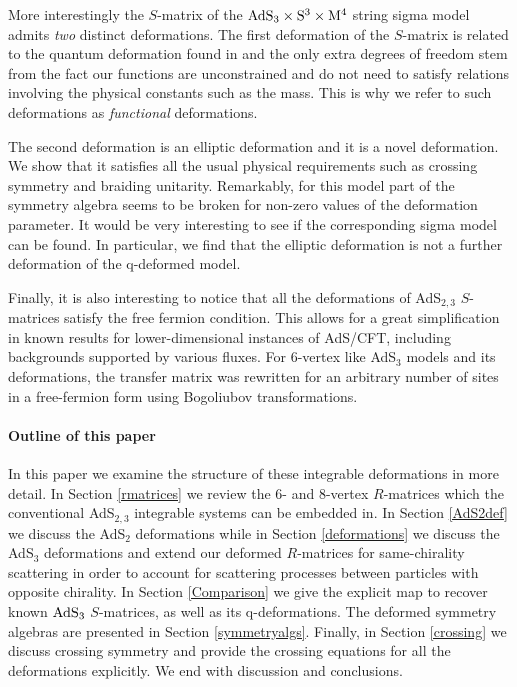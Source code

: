 \documentclass[12pt,a4paper]{article}
\numberwithin{equation}{section}
\begin{document}
More interestingly the $S$-matrix of the $ {{\rm AdS}}_3\times \mathrm{S}^3\times \mathrm{M}^4$ string sigma model admits \textit{two} distinct deformations. The first deformation of the $S$-matrix is related to the quantum deformation found in \cite{Hoare:2014oua,Seibold:2021lju} and the only extra degrees of freedom stem from the fact our functions are unconstrained and do not need to satisfy relations involving the physical constants such as the mass. This is why we refer to such deformations as \textit{functional} deformations.

The second deformation is an elliptic deformation and it is a novel deformation. We show that it satisfies all the usual physical requirements such as crossing symmetry and braiding unitarity. Remarkably, for this model part of the symmetry algebra seems to be broken for non-zero values of the deformation parameter. It would be very interesting to see if the corresponding sigma model can be found. In particular, we find that the elliptic deformation is not a further deformation of the q-deformed model\cite{Hoare:2014oua}.

Finally, it is also interesting to notice that all the deformations of AdS$ _{2,3} $ $S$-matrices satisfy the free fermion condition\cite{deLeeuw:2020bgo}. This allows for a great simplification in known results for lower-dimensional instances of AdS/CFT, including backgrounds supported by various fluxes. %
For 6-vertex like AdS$ _3 $ models and its deformations, the transfer matrix was rewritten for an arbitrary number of sites in a free-fermion form using Bogoliubov transformations.

\paragraph{Outline of this paper} 
In this paper we examine the structure of these integrable deformations in more detail. In Section \ref{rmatrices} we review the $6$- and $8$-vertex $R$-matrices which the conventional AdS${}_{2,3}$ integrable systems can be embedded in. In Section \ref{AdS2def} we discuss the AdS$_2$ deformations while in Section \ref{deformations} we discuss the AdS$ _3 $ deformations and extend our deformed $R$-matrices for same-chirality scattering in order to account for scattering processes between particles with opposite chirality. In Section \ref{Comparison} we give the explicit map to recover known $ {{\rm AdS}}_3$ $S$-matrices, as well as its q-deformations. The deformed symmetry algebras are presented in Section \ref{symmetryalgs}. Finally, in Section  \ref{crossing} we discuss crossing symmetry and  provide the crossing equations for all the deformations explicitly. We end with discussion and conclusions.
\end{document}

